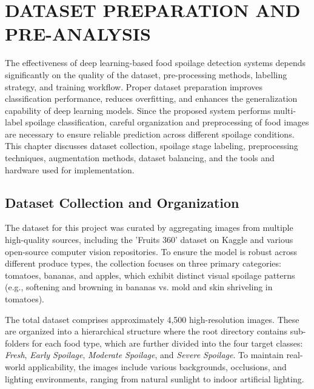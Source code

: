 \chapter{DATASET PREPARATION AND PRE-ANALYSIS}
The effectiveness of deep learning-based food spoilage detection systems depends significantly on the quality of the dataset, pre-processing methods, labelling strategy, and training workflow. Proper dataset preparation improves classification performance, reduces overfitting, and enhances the generalization capability of deep learning models. Since the proposed system performs multi-label spoilage classification, careful organization and preprocessing of food images are necessary to ensure reliable prediction across different spoilage conditions. This chapter discusses dataset collection, spoilage stage labeling, preprocessing techniques, augmentation methods, dataset balancing, and the tools and hardware used for implementation.

\section[Dataset Collection and Organization]{\textbf{Dataset Collection and Organization}}
The dataset for this project was curated by aggregating images from multiple high-quality sources, including the 'Fruits 360' dataset on Kaggle and various open-source computer vision repositories. To ensure the model is robust across different produce types, the collection focuses on three primary categories: tomatoes, bananas, and apples, which exhibit distinct visual spoilage patterns (e.g., softening and browning in bananas vs. mold and skin shriveling in tomatoes). 

The total dataset comprises approximately 4,500 high-resolution images. These are organized into a hierarchical structure where the root directory contains sub-folders for each food type, which are further divided into the four target classes: \textit{Fresh}, \textit{Early Spoilage}, \textit{Moderate Spoilage}, and \textit{Severe Spoilage}. To maintain real-world applicability, the images include various backgrounds, occlusions, and lighting environments, ranging from natural sunlight to indoor artificial lighting.

